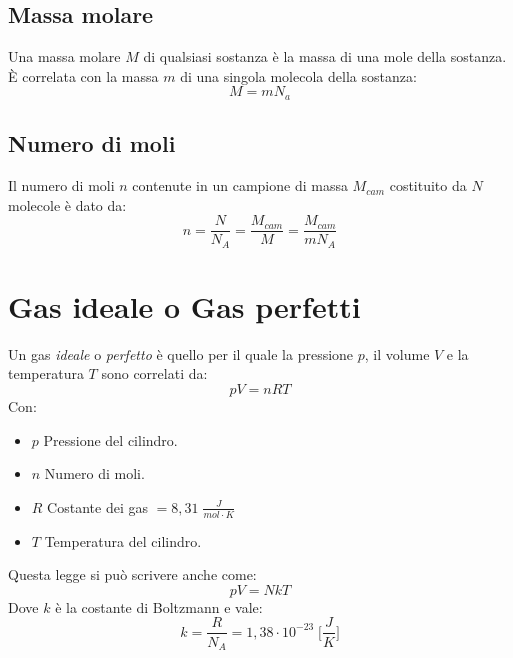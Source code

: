         \subsection{Massa molare} Una massa molare $M$ di qualsiasi sostanza è
        la massa di una mole della sostanza. È correlata con la massa $m$ di 
        una singola molecola della sostanza:
            \begin{equation}
                M = mN_a
            \end{equation}
        
        \subsection{Numero di moli} Il numero di moli $n$ contenute in un 
        campione di massa $M_{cam}$ costituito da $N$ molecole è dato da:
            \begin{equation}
                n = \frac{N}{N_A} = \frac{M_{cam}}{M} = \frac{M_{cam}}{mN_A}
            \end{equation}

    \section{Gas ideale o Gas perfetti} \label{gasp} Un gas \textit{ideale} o 
        \textit{ perfetto} è quello per il quale la pressione $p$, il volume 
        $V$ e la temperatura $T$ sono correlati da:
        \begin{equation}
            pV = nRT
        \end{equation}
    Con:
        \begin{itemize}
            \item $p$ Pressione del cilindro.
            \item $n$ Numero di moli.
            \item $R$ Costante dei gas $= 8,31 \; \frac{J}{mol \cdot K}$
            \item $T$ Temperatura del cilindro.
        \end{itemize}
    Questa legge si può scrivere anche come:
        \begin{equation}
            pV = NkT
        \end{equation}
    Dove $k$ è la costante di Boltzmann e vale:
        \begin{equation*}
            k = \frac{R}{N_A} = 1,38 \cdot 10^{-23} \; \Bigg[\frac{J}{K}\Bigg]
        \end{equation*}
